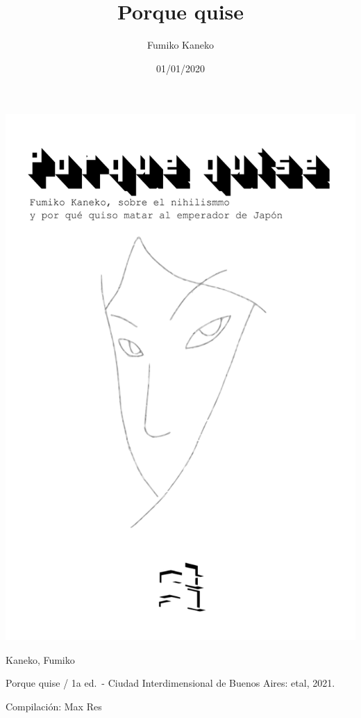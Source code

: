 \documentclass[
]{book}
\title{Porque quise}
\author{Fumiko Kaneko}
\date{01/01/2020}
\begin{document}
\maketitle

{
\setcounter{tocdepth}{1}
\tableofcontents
}
\hypertarget{section}{%
\chapter*{}\label{section}}

\includegraphics{images/pqq2.png}

Kaneko, Fumiko

Porque quise / 1a ed.~- Ciudad Interdimensional de
Buenos Aires: etal, 2021.

Compilación: Max Res
\end{document}
